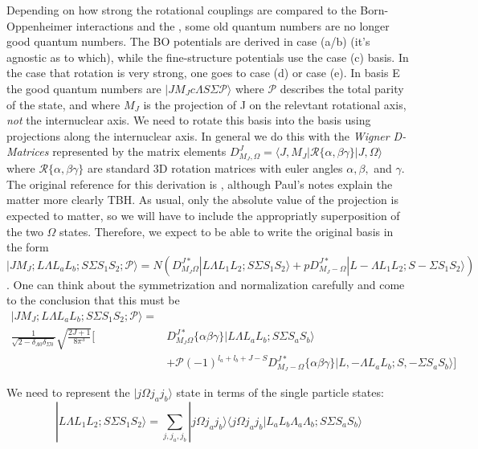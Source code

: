 \documentclass[prl, longbibliography]{revtex4-2}
\begin{document}
Depending on how strong the rotational couplings are compared to the Born-Oppenheimer interactions and the , some old quantum numbers are no longer good quantum numbers. The BO potentials are derived in case (a/b) (it's agnostic as to which), while the fine-structure potentials use the case (c) basis. In the case that rotation is very strong, one goes to case (d) or case (e). In basis E the good quantum numbers are $|J M_J c \Lambda S \Sigma \mathcal{P} \rangle $ where $\mathcal{P}$ describes the total parity of the state, and where $M_J$ is the projection of J on the relevtant rotational axis, \emph{not} the internuclear axis. We need to rotate this basis into the basis using projections along the internuclear axis. In general we do this with the \emph{Wigner D-Matrices} represented by the matrix elements $D^J_{M_J,\Omega}=\langle J,M_J|\mathcal{R}\{\alpha,\beta\gamma\}|J, \Omega\rangle$ where $\mathcal{R}\{\alpha,\beta\gamma\}$ are standard 3D rotation matrices with euler angles $\alpha, \beta,$ and $\gamma$. The original reference for this derivation is \cite{singer_theory_1983}, although Paul's notes explain the matter more clearly TBH. 
As usual, only the absolute value of the projection is expected to matter, so we will have to include the appropriatly superposition of the two $\Omega$ states. 
Therefore, we expect to be able to write the original basis in the form $|J M_J; L \Lambda L_a L_b; S \Sigma  S_1 S_2; \mathcal{P} \rangle=N(D^{J*}_{M_J\Omega}|L \Lambda L_1 L_2; S \Sigma S_1 S_2\rangle+pD^{J*}_{M_J-\Omega}|L -\Lambda L_1 L_2; S -\Sigma S_1 S_2\rangle)$. One can think about the symmetrization and normalization carefully and come to the conclusion that this must be
\begin{equation}
\begin{split}
|J M_J; L \Lambda L_a L_b; S \Sigma  S_1 S_2; \mathcal{P} \rangle=\\
\frac{1}{\sqrt{2-\delta_{\Lambda 0}\delta_{\Sigma 0}}}\sqrt{\frac{2J+1}{8\pi^3}}\bigg[&D^{J*}_{M_J\Omega}\{\alpha \beta \gamma\}|L \Lambda L_a L_b; S \Sigma S_a S_b\rangle\\
&+\mathcal{P}(-1)^{l_a+l_b+J-S}D^{J*}_{M_J-\Omega}\{\alpha \beta \gamma\}|L, -\Lambda L_a L_b; S, -\Sigma S_a S_b\rangle\bigg]
\end{split}
\end{equation}

We need to represent the $|j\Omega j_a j_b\rangle$ state in terms of the single particle states:
\begin{equation}
|L \Lambda L_1 L_2; S \Sigma S_1 S_2\rangle = \sum_{j, j_a, j_b} |j\Omega j_a j_b\rangle\langle j\Omega j_a j_b | L_a L_b \Lambda_a \Lambda_b; S\Sigma S_a S_b\rangle
\end{equation}
\end{document}
